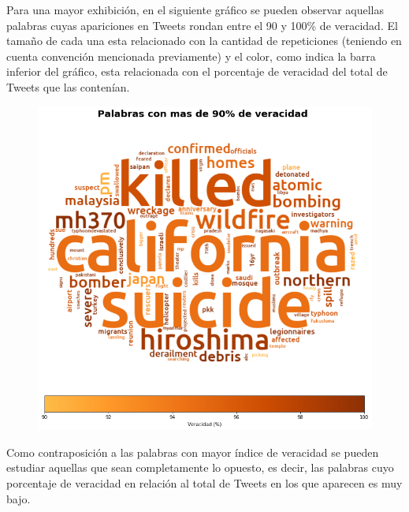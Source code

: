 \documentclass[titlepage,a4paper]{article}
\begin{document}
    Para una mayor exhibición, en el siguiente gráfico se pueden observar aquellas palabras cuyas apariciones en Tweets rondan entre el 90 y 100\% de veracidad. El tamaño de cada una esta relacionado con la cantidad de repeticiones (teniendo en cuenta convención mencionada previamente) y el color, como indica la barra inferior del gráfico, esta relacionada con el porcentaje de veracidad del total de Tweets que las contenían.
    \begin{figure}[H]
    \centering
    \includegraphics[width=1\textwidth]{graficos/Analisis Lexico Grafico/palabras_con_mas_de_90_de_veracidad.png}
    \caption{} 
    \end{figure}
    
    Como contraposición a las palabras con mayor índice de veracidad se pueden estudiar aquellas que sean completamente lo opuesto, es decir, las palabras cuyo porcentaje de veracidad en relación al total de Tweets en los que aparecen es muy bajo. 
    
\end{document}
